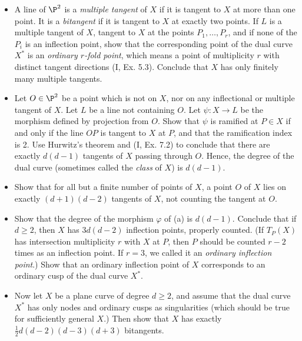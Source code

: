 \documentclass[a4paper]{article}
\begin{document}
\begin{enumerate} [label=\textbf{\arabic*.}, leftmargin=0em]
\begin{itemize}
          \item[(b)] A line of $\P^2$ is a \textit{multiple tangent} of $X$ if it is tangent to $X$ at more than one point.
                It is a \textit{bitangent} if it is tangent to $X$ at exactly two points.
                If $L$ is a multiple tangent of $X$, tangent to $X$ at the points $P_1, \dots, P_r$, and if none of the $P_i$ is an inflection point, show that the corresponding point of the dual curve $X^*$ is an \textit{ordinary $r$-fold point}, which means a point of multiplicity $r$ with distinct tangent directions (I, Ex. 5.3).
                Conclude that $X$ has only finitely many multiple tangents.

          \item[(c)] Let $O \in \P^2$ be a point which is not on $X$, nor on any inflectional or multiple tangent of $X$.
                Let $L$ be a line not containing $O$.
                Let $\psi : X \to L$ be the morphism defined by projection from $O$.
                Show that $\psi$ is ramified at $P \in X$ if and only if the line $OP$ is tangent to $X$ at $P$, and that the ramification index is 2.
                Use Hurwitz's theorem and (I, Ex. 7.2) to conclude that there are exactly $d(d - 1)$ tangents of $X$ passing through $O$.
                Hence, the degree of the dual curve (sometimes called the \textit{class} of $X$) is $d(d - 1)$.

          \item[(d)] Show that for all but a finite number of points of $X$, a point $O$ of $X$ lies on exactly $(d + 1)(d - 2)$ tangents of $X$, not counting the tangent at $O$.

          \item[(e)] Show that the degree of the morphism $\varphi$ of (a) is $d(d - 1)$.
                Conclude that if $d \geq 2$, then $X$ has $3d(d - 2)$ inflection points, properly counted.
                (If $T_P(X)$ has intersection multiplicity $r$ with $X$ at $P$, then $P$ should be counted $r - 2$ times as an inflection point.
                If $r = 3$, we called it an \textit{ordinary inflection point}.)
                Show that an ordinary inflection point of $X$ corresponds to an ordinary cusp of the dual curve $X^*$.

          \item[(f)] Now let $X$ be a plane curve of degree $d \geq 2$, and assume that the dual curve $X^*$ has only nodes and ordinary cusps as singularities (which should be true for sufficiently general $X$.)
                Then show that $X$ has exactly $\frac{1}{2}d(d - 2)(d - 3)(d + 3)$ bitangents.


\end{itemize}
\end{enumerate}
\end{document}
